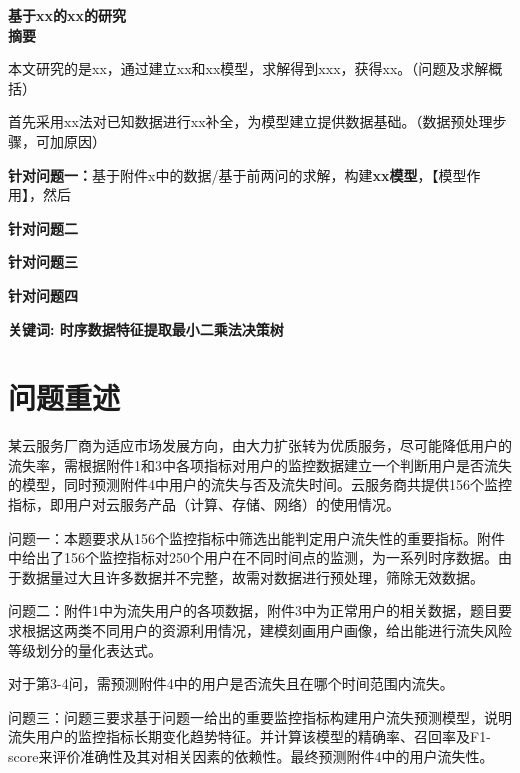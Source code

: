 \documentclass{ctexart}
\begin{document}
    \begin{spacing}{2.0}
        \begin{center}
            {\LARGE\textbf{基于xx的xx的研究}}\\
            {\Large\textbf{摘要}}\\
        \end{center}
    \end{spacing}

    本文研究的是xx，通过建立xx和xx模型，求解得到xxx，获得xx。（问题及求解概括）
    
    首先采用xx法对已知数据进行xx补全，为模型建立提供数据基础。（数据预处理步骤，可加原因）
    
    \textbf{针对问题一：}\quad 基于附件x中的数据/基于前两问的求解，构建\textbf{xx模型}，【模型作用】，然后
    
    \textbf{针对问题二}\quad 

    \textbf{针对问题三}\quad 
 
    \textbf{针对问题四}\quad 
    
    
    \quad

    \textbf{关键词: \quad 时序数据特征提取\quad 最小二乘法\quad 决策树 }

    \newpage
    \section{问题重述}
    某云服务厂商为适应市场发展方向，由大力扩张转为优质服务，尽可能降低用户的流失率，需根据附件1和3中各项指标对用户的监控数据建立一个判断用户是否流失的模型，同时预测附件4中用户的流失与否及流失时间。云服务商共提供156个监控指标，即用户对云服务产品（计算、存储、网络）的使用情况。

    问题一：本题要求从156个监控指标中筛选出能判定用户流失性的重要指标。附件中给出了156个监控指标对250个用户在不同时间点的监测，为一系列时序数据。由于数据量过大且许多数据并不完整，故需对数据进行预处理，筛除无效数据。

    问题二：附件1中为流失用户的各项数据，附件3中为正常用户的相关数据，题目要求根据这两类不同用户的资源利用情况，建模刻画用户画像，给出能进行流失风险等级划分的量化表达式。

    对于第3-4问，需预测附件4中的用户是否流失且在哪个时间范围内流失。

    问题三：问题三要求基于问题一给出的重要监控指标构建用户流失预测模型，说明流失用户的监控指标长期变化趋势特征。并计算该模型的精确率、召回率及F1-score来评价准确性及其对相关因素的依赖性。最终预测附件4中的用户流失性。
\end{document}
